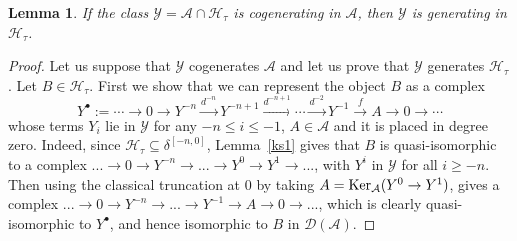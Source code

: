 \documentclass{proc-l}
\newtheorem{lemma}[theorem]{Lemma}
\theoremstyle{definition}
\theoremstyle{remark}
\numberwithin{equation}{section}
\begin{document}
\begin{lemma}\label{tiltvscotitl}
If the class $\mathcal{Y}=\mathcal{A}\cap\mathcal{H}_\tau$ is cogenerating
in $\mathcal{A}$, then
$\mathcal{Y}$ is generating in $\mathcal{H}_\tau$.
\end{lemma}
%
\begin{proof}
Let us suppose that $\mathcal{Y}$ cogenerates $\mathcal{A}$ and let us prove that 
$\mathcal{Y}$ generates $\mathcal{H}_\tau$.
Let $B \in \mathcal{H}_\tau$. First we show that we can represent the object $B$ as a complex
\[Y^\bullet:=
\cdots \to 0 \to Y^{-n} \stackrel{d^{-n}}\to Y^{-n+1}\stackrel{d^{-n+1}}\to\cdots 
\stackrel{d^{-2}}\to Y^{-1} \stackrel{f}\to A \to 0\to \cdots
\]
whose terms  $Y_i$ lie in $\mathcal{Y}$ for any $-n\leq i\leq -1$, $A\in\mathcal{A}$ and it is placed in degree zero. Indeed, since $\mathcal{H}_\tau\subseteq \delta^{[-n, 0]}$, Lemma~\ref{ks1} gives that $B$ is quasi-isomorphic to a complex 
$...\rightarrow 0\rightarrow Y^{-n}\rightarrow ...\rightarrow Y^0\rightarrow Y^1\rightarrow ...$, with $Y^i$ in $\mathcal{Y}$ for all $i\geq -n$. Then using the classical truncation at $0$ by taking $A={\rm Ker}_\mathcal{A}(Y^0\rightarrow Y^1)$, gives a complex 
$... \rightarrow 0\rightarrow Y^{-n}\rightarrow ...\rightarrow Y^{-1}\rightarrow A\rightarrow 0 \rightarrow...$, which is clearly quasi-isomorphic to $Y^\bullet$, and hence isomorphic to $B$ in $\mathcal{D}(\mathcal{A})$.


\end{proof}
\end{document}
